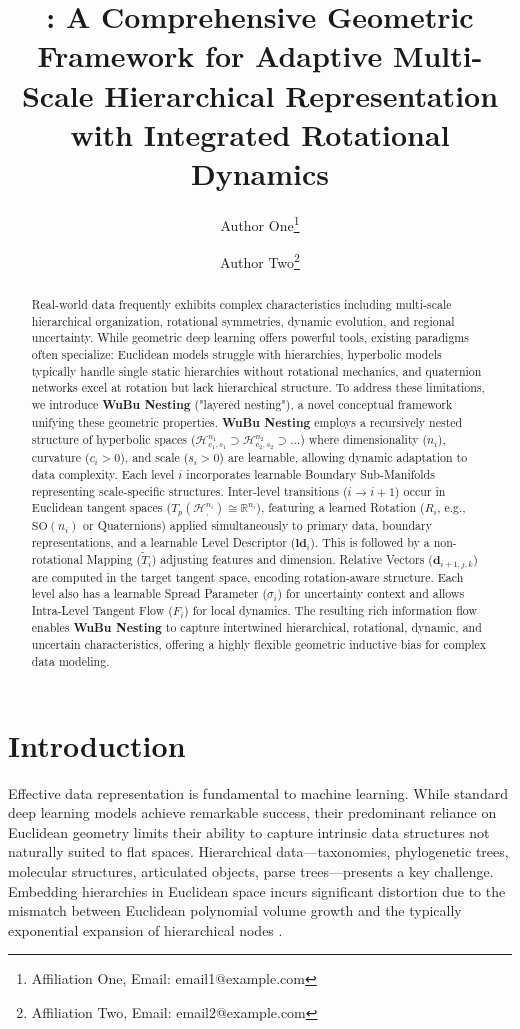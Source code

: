 \documentclass[11pt, twoside]{article} %
\title{\wubu: A Comprehensive Geometric Framework for Adaptive Multi-Scale Hierarchical Representation with Integrated Rotational Dynamics}
\author{
    Author One\thanks{Affiliation One, Email: email1@example.com}
    \and
    Author Two\thanks{Affiliation Two, Email: email2@example.com}
}
\date{} %
\newcommand{\HypSpace}[3]{\mathcal{H}^{#1}_{#2, #3}} %
\newcommand{\R}{\mathbb{R}} %
\newcommand{\SO}[1]{\text{SO}(#1)} %
\newcommand{\wubu}{\textbf{WuBu Nesting}} %
\begin{document}
\maketitle

\begin{abstract}
Real-world data frequently exhibits complex characteristics including multi-scale hierarchical organization, rotational symmetries, dynamic evolution, and regional uncertainty. While geometric deep learning offers powerful tools, existing paradigms often specialize: Euclidean models struggle with hierarchies, hyperbolic models typically handle single static hierarchies without rotational mechanics, and quaternion networks excel at rotation but lack hierarchical structure. To address these limitations, we introduce \wubu{} ("layered nesting"), a novel conceptual framework unifying these geometric properties. \wubu{} employs a recursively nested structure of hyperbolic spaces ($\HypSpace{n_1}{c_1}{s_1} \supset \HypSpace{n_2}{c_2}{s_2} \supset \dots$) where dimensionality ($n_i$), curvature ($c_i > 0$), and scale ($s_i > 0$) are learnable, allowing dynamic adaptation to data complexity. Each level $i$ incorporates learnable Boundary Sub-Manifolds representing scale-specific structures. Inter-level transitions ($i \rightarrow i+1$) occur in Euclidean tangent spaces ($T_p(\HypSpace{n_i}{}{}) \cong \R^{n_i}$), featuring a learned Rotation ($R_i$, e.g., $\SO{n_i}$ or Quaternions) applied simultaneously to primary data, boundary representations, and a learnable Level Descriptor ($\mathbf{ld}_i$). This is followed by a non-rotational Mapping ($\tilde{T}_i$) adjusting features and dimension. Relative Vectors ($\mathbf{d}_{i+1, j, k}$) are computed in the target tangent space, encoding rotation-aware structure. Each level also has a learnable Spread Parameter ($\sigma_i$) for uncertainty context and allows Intra-Level Tangent Flow ($F_i$) for local dynamics. The resulting rich information flow enables \wubu{} to capture intertwined hierarchical, rotational, dynamic, and uncertain characteristics, offering a highly flexible geometric inductive bias for complex data modeling.
\end{abstract}


\section{Introduction}
\label{sec:introduction}

Effective data representation is fundamental to machine learning. While standard deep learning models achieve remarkable success, their predominant reliance on Euclidean geometry limits their ability to capture intrinsic data structures not naturally suited to flat spaces. Hierarchical data---taxonomies, phylogenetic trees, molecular structures, articulated objects, parse trees---presents a key challenge. Embedding hierarchies in Euclidean space incurs significant distortion due to the mismatch between Euclidean polynomial volume growth and the typically exponential expansion of hierarchical nodes \cite{NickelKiela2017}.
\end{document}

